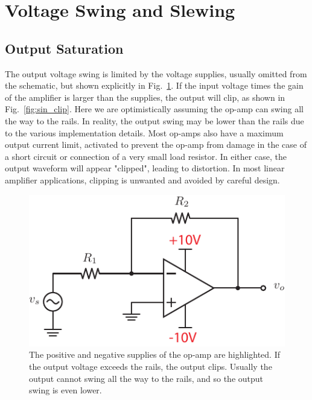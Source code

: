 \section{Voltage Swing and Slewing }
\subsection{Output Saturation}
The output voltage swing is limited by the voltage supplies, usually omitted from the schematic, but shown explicitly in Fig.~\ref{fig:opamp_invert_gain_supplies}.  If the input voltage times the gain of the amplifier is larger than the supplies, the output will clip, as shown in Fig.~\ref{fig:sin_clip}.  Here we are optimistically assuming the op-amp can swing all the way to the rails.  In reality, the output swing may be lower than the rails due to the various implementation details.  Most op-amps also have a maximum output current limit, activated to prevent the op-amp from damage in the case of a short circuit or connection of a very small load resistor.  In either case, the output waveform will appear "clipped", leading to distortion.  In most linear amplifier applications, clipping is unwanted and avoided by careful design.
\begin{figure}[tb]
\centering
\includegraphics[scale=1]{opamp_invert_gain_supplies}
\caption{The positive and negative supplies of the op-amp are highlighted.  If the output voltage exceeds the rails, the output clips.  Usually the output cannot swing all the way to the rails, and so the output swing is even lower.}
\label{fig:opamp_invert_gain_supplies}
\end{figure}
